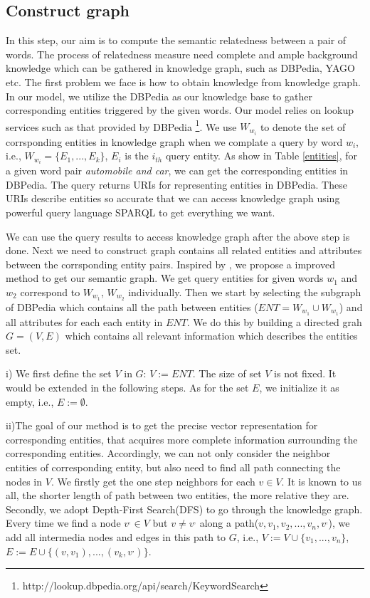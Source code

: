 \subsection{Construct graph}
In this step, our aim is to compute the semantic relatedness between a pair of words. The process of relatedness measure
need complete and ample background knowledge which can be gathered in knowledge graph, such as DBPedia, YAGO etc.
The first problem we face is how to obtain knowledge from knowledge graph. In our model, we utilize the DBPedia as
our knowledge base to gather corresponding entities triggered by the given words. Our model relies on lookup
services such as that provided by DBPedia \footnote{http://lookup.dbpedia.org/api/search/KeywordSearch}. 
We use $W_{w_i}$ to denote the set of corrsponding entities in knowledge graph when we complate a query by word $w_i$,
i.e., $W_{w_i}=\{E_1,...,E_k\}$, $E_i$ is the $i_{th}$ query entity.
As show in Table \ref{entities}, for a given word pair \emph{automobile and car}, 
we can get the corresponding entities in DBPedia. The query returns URIs for representing entities in DBPedia. 
These URIs describe entities so accurate that we can access knowledge graph using powerful query language SPARQL 
to get everything we want.

We can use the query results to access knowledge graph after the above step is done. Next we need to construct graph 
contains all related entities and attributes between the corrsponding entity pairs. Inspired by \cite{aaai/NavigliP12},
we propose a improved method to get our semantic graph. We get query entities for
given words $w_1$ and $w_2$  correspond to $W_{w_1}$, $W_{w_2}$ individually. 
Then we start by selecting the subgraph of DBPedia which contains all the path between entities
($ENT = W_{w_1} \cup W_{w_1}$) and all attributes for each each entity in $ENT$. We do 
this by building a directed grah ${G = (V, E)}$ which contains all relevant information which describes
the entities set.

i) We first define the set $V$ in $G$: $V:=ENT$. 
The size of set $V$ is not fixed. It would be extended in the following steps.
As for the set $E$, we initialize it as empty, i.e., $E:=\emptyset$.

ii)The goal of our method is to get the precise vector representation for corresponding entities,
that acquires more complete information surrounding the corresponding entities.
Accordingly, we can not only consider the neighbor entities of corresponding entity, but also
need to find all path connecting the nodes in $V$. 
We firstly get the one step neighbors for each $v \in V$. It is known to us all, the shorter
length of path between two entities, the more relative they are.
Secondly, we adopt Depth-First Search(DFS) to go through the knowledge graph. Every time we find a node
$v^, \in V$ but $v \ne v^,$ along a path($v, v_1, v_2,...,v_n, v^,$), we add all intermedia 
nodes and edges in this path to $G$, i.e., $V:=V \cup \{v_1, ..., v_n\}$, 
$E:=E \cup \{(v, v_1), ..., (v_k, v^ ,)\}$.

